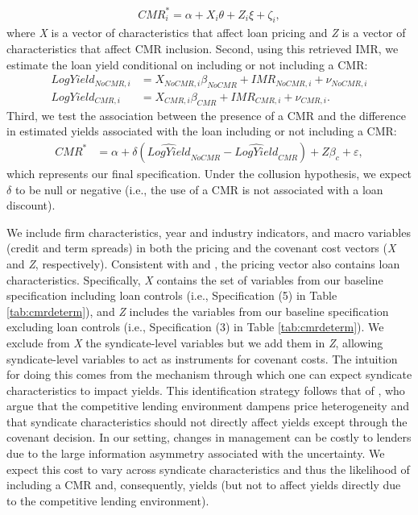 \documentclass[a4paper,12pt]{article}
\begin{document}
 \begin{align}
    CMR^*_i = \alpha + X_i \theta + Z_i \xi + \zeta_i,
 \end{align}%
%
  where \textit{X} is a vector of characteristics that affect loan pricing and \textit{Z} is a vector of characteristics that affect CMR inclusion.
Second, using this retrieved IMR, we estimate the loan yield conditional on including or not including a CMR:
 \begin{align}
 LogYield_{NoCMR,i} &= X_{NoCMR,i} \beta_{NoCMR} + IMR_{NoCMR,i} + \nu_{NoCMR,i} \\
    LogYield_{CMR,i} &= X_{CMR,i} \beta_{CMR} + IMR_{CMR,i} + \nu_{CMR,i}.
 \end{align}
%
Third, we test the association between the presence of a CMR and the difference in estimated yields associated with the loan including or not including a CMR:
 \begin{align}
    CMR^* &= \alpha + \delta \left(\widehat{LogYield}_{NoCMR} - \widehat{LogYield}_{CMR}\right) + Z\beta_c + \varepsilon,
 \end{align}%
%
which represents our final specification.
Under the collusion hypothesis, we expect $\delta$ to be null or negative (i.e., the use of a CMR is not associated with a loan discount).



We include firm characteristics, year and industry indicators, and macro variables (credit and term spreads) in both the pricing and the covenant cost vectors (\textit{X} and \textit{Z}, respectively).
Consistent with \citet{Goyal_2005} and \citet{Miller_2012}, the pricing vector also contains loan characteristics.
Specifically, \textit{X} contains the set of variables from our baseline specification including loan controls (i.e., Specification (5) in Table \ref{tab:cmrdeterm}), and \textit{Z} includes the variables from our baseline specification excluding loan controls (i.e., Specification (3) in Table \ref{tab:cmrdeterm}).
We exclude from \textit{X} the syndicate-level variables but we add them in \textit{Z}, allowing syndicate-level variables to act as instruments for covenant costs.
The intuition for doing this comes from the mechanism through which one can expect syndicate characteristics to impact yields.
This identification strategy follows that of \citet{Bradley_2015}, who argue that the competitive lending environment dampens price heterogeneity and that syndicate characteristics should not directly affect yields except through the covenant decision.
In our setting, changes in management can be costly to lenders due to the large information asymmetry associated with the uncertainty.
We expect this cost to vary across syndicate characteristics and thus the likelihood of including a CMR and, consequently, yields (but not to affect yields directly due to the competitive lending environment).
\end{document}
